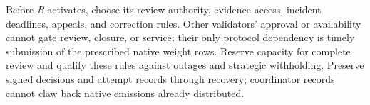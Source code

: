 Before \textit{B} activates, choose its review authority, evidence access,
incident deadlines, appeals, and correction rules. Other validators' approval
or availability cannot gate review, closure, or service; their only protocol
dependency is timely submission of the prescribed native weight rows.
Reserve capacity for complete review and qualify these rules against outages
and strategic withholding. Preserve signed decisions and attempt records through
recovery; coordinator records cannot claw back native emissions already
distributed.
